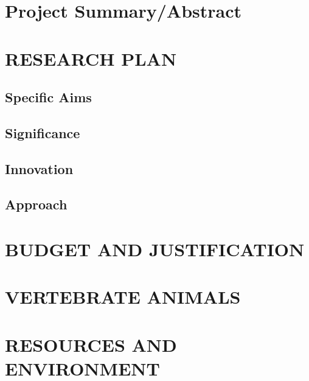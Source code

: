 \documentclass[11pt]{nih}
\def\mydate{2005-06-09 13:58:03 brd}
\begin{document}
\bigskip

\appendix 


\setcounter{page}{20} %


\section{Project Summary/Abstract}

\section{RESEARCH PLAN}
\subsection{Specific Aims}


\subsection{Significance}
\subsection{Innovation}
\subsection{Approach}
\section{BUDGET AND JUSTIFICATION}
\newpage

\section{VERTEBRATE ANIMALS}
\section{RESOURCES AND ENVIRONMENT}
\end{document}
